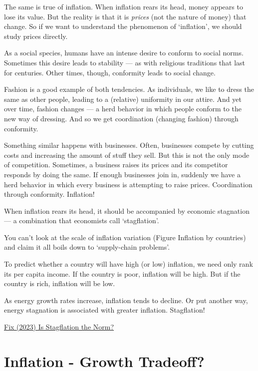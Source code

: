 \documentclass[
]{book}
\begin{document}
The same is true of inflation. When inflation rears its head, money appears to lose its value. But the reality is that it is \emph{prices} (not the nature of money) that change. So if we want to understand the phenomenon of `inflation', we should study prices directly.

As a social species, humans have an intense desire to conform to social norms. Sometimes this desire leads to stability --- as with religious traditions that last for centuries. Other times, though, conformity leads to social change.

Fashion is a good example of both tendencies. As individuals, we like to dress the same as other people, leading to a (relative) uniformity in our attire. And yet over time, fashion changes --- a herd behavior in which people conform to the new way of dressing. And so we get coordination (changing fashion) through conformity.

Something similar happens with businesses. Often, businesses compete by cutting costs and increasing the amount of stuff they sell. But this is not the only mode of competition. Sometimes, a business raises its prices and its competitor responds by doing the same. If enough businesses join in, suddenly we have a herd behavior in which every business is attempting to raise prices. Coordination through conformity. Inflation!

When inflation rears its head, it should be accompanied by economic stagnation --- a combination that economists call `stagflation'.

You can't look at the scale of inflation variation (Figure Inflation by countries) and claim it all boils down to `supply-chain problems'.

To predict whether a country will have high (or low) inflation, we need only rank its per capita income. If the country is poor, inflation will be high. But if the country is rich, inflation will be low.

As energy growth rates increase, inflation tends to decline. Or put another way, energy stagnation is associated with greater inflation. Stagflation!

\href{https://economicsfromthetopdown.com/2023/01/17/is-stagflation-the-norm/}{Fix (2023) Is Stagflation the Norm?}

\hypertarget{inflation---growth-tradeoff}{%
\section{Inflation - Growth Tradeoff?}\label{inflation---growth-tradeoff}}
\end{document}
